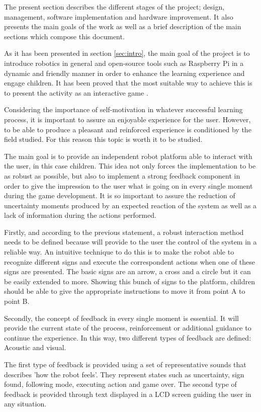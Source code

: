 The present section describes the different stages of the project; design, management, software implementation and hardware improvement. It also presents the main goals of the work as well as a brief description of the main sections which compose this document.

As it has been presented in section \ref{sec:intro}, the main goal of the project is to introduce robotics in general and open-source tools such as Raspberry Pi in a dynamic and friendly manner in order to enhance the learning experience and engage children. It has been proved that the most suitable way to achieve this is to present the activity as an interactive game \cite{bransford1999people}.

Considering the importance of self-motivation in whatever successful learning process, it is important to assure an enjoyable experience for the user. However, to be able to produce a pleasant and reinforced experience is conditioned by the field studied. For this reason this topic is worth it to be studied.

The main goal is to provide an independent robot platform able to interact with the user, in this case children. This idea not only forces the implementation to be as robust as possible, but also to implement a strong feedback component in order to give the impression to the user what is going on in every single moment during the game development. It is so important to assure the reduction of uncertainty moments produced by an expected reaction of the system as well as a lack of information during the actions performed. 

Firstly, and according to the previous statement, a robust interaction method needs to be defined because will provide to the user the control of the system in a reliable way. An intuitive technique to do this is to make the robot able to recognize different signs and execute the correspondent actions when one of these signs are presented. The basic signs are an arrow, a cross and a circle but it can be easily extended to more. Showing this bunch of signs to the platform, children should be able to give the appropriate instructions to move it from point A to point B.

Secondly, the concept of feedback in every single moment is essential. It will provide the current state of the process, reinforcement or additional guidance to continue the experience. In this way, two different types of feedback are defined: Acoustic and visual. 

The first type of feedback is provided using a set of representative sounds that describes 'how the robot feels'. They represent states such as uncertainty, sign found, following mode, executing action and game over. The second type of feedback is provided through text displayed in a LCD screen guiding the user in any situation.

